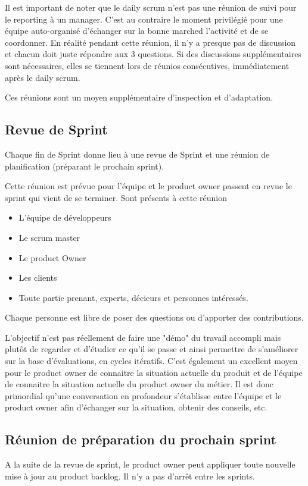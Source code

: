 Il est important de noter que le daily scrum n'est pas une réunion de suivi pour le reporting à un manager. C'est au contraire le moment privilégié pour une équipe auto-organisé d'échanger sur la bonne marched l'activité et de se coordonner. 
En réalité pendant cette réunion, il n'y a presque pas de discussion et chacun doit juste répondre aux 3 questions. 
Si des discussions supplémentaires sont nécessaires, elles se tiennent lors de réunios consécutives, immédiatement après le daily scrum. 

Ces réunions sont un moyen supplémentaire d'inspection et d'adaptation. 


\subsection{Revue de Sprint}
Chaque fin de Sprint donne lieu à une revue de Sprint et une réunion de planification (préparant le prochain sprint). 

Cette réunion est prévue pour l'équipe et le product owner passent en revue le sprint qui vient de se terminer. 
Sont présents à cette réunion 

\begin{itemize}
\item L'équipe de développeurs
\item Le scrum master
\item Le product Owner
\item Les clients
\item Toute partie prenant, experts, décieurs et personnes intéressés. 
\end{itemize}

Chaque personne est libre de poser des questions ou d'apporter des contributions. 


L'objectif n'est pas réellement de faire une "démo" du travail accompli mais plutôt de regarder et d'étudier ce qu'il se passe et ainsi permettre de s'améliorer sur la base d'évaluations, en cycles itératifs. 
C'est également un excellent moyen pour le product owner de connaitre la situation actuelle du produit et de l'équipe de connaitre la situation actuelle du product owner du métier. 
Il est donc primordial qu'une conversation en profondeur s'établisse entre l'équipe et le product owner afin d'échanger sur la situation, obtenir des conseils, etc. 


\subsection{Réunion de préparation du prochain sprint}
A la suite de la revue de sprint, le product owner peut appliquer toute nouvelle mise à jour au product backlog. 
Il n'y a pas d'arrêt entre les sprints.

